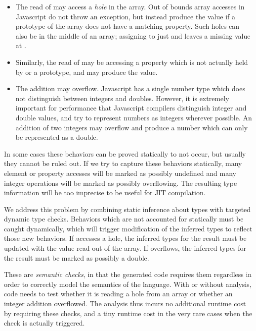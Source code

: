 \begin{itemize}

\item The read of  may access a {\it hole} in the array.
Out of bounds array accesses in Javascript do not throw an exception,
but instead produce the  value if a prototype of the
array does not have a matching property.
Such holes can also be in the middle of an array;
assigning to just  and  leaves a missing
value at .

\item Similarly, the read of  may be accessing a property
which is not actually held by  or a prototype, and may produce the
 value.

\item The addition  may overflow.
Javascript has a single number type which does not distinguish between
integers and doubles.
However, it is extremely important for performance that Javascript compilers
distinguish integer and double values, and try to represent numbers as
integers wherever possible.
An addition of two integers may overflow and produce a number which can
only be represented as a double.

\end{itemize}

In some cases these behaviors can be proved statically to not occur,
but usually they cannot be ruled out.
If we try to capture these behaviors statically, many element or property
accesses will be marked as possibly undefined and many integer operations
will be marked as possibly overflowing.
The resulting type information will be too imprecise to be useful for
JIT compilation.

We address this problem by combining static inference about types
with targeted dynamic type checks.
Behaviors which are not accounted for statically must be caught dynamically,
which will trigger modification of the inferred types to reflect
those new behaviors.
If  accesses a hole, the inferred types for the result must be
updated with the value read out of the array.
If  overflows, the inferred types for the result must be
marked as possibly a double.

These are {\it semantic checks}, in that the generated code requires
them regardless in order to correctly model the semantics of the language.
With or without analysis, code needs to test whether it is reading a
hole from an array or whether an integer addition overflowed.
The analysis thus incurs no additional runtime cost by requiring
these checks, and a tiny runtime cost in the very rare cases when the
check is actually triggered.

